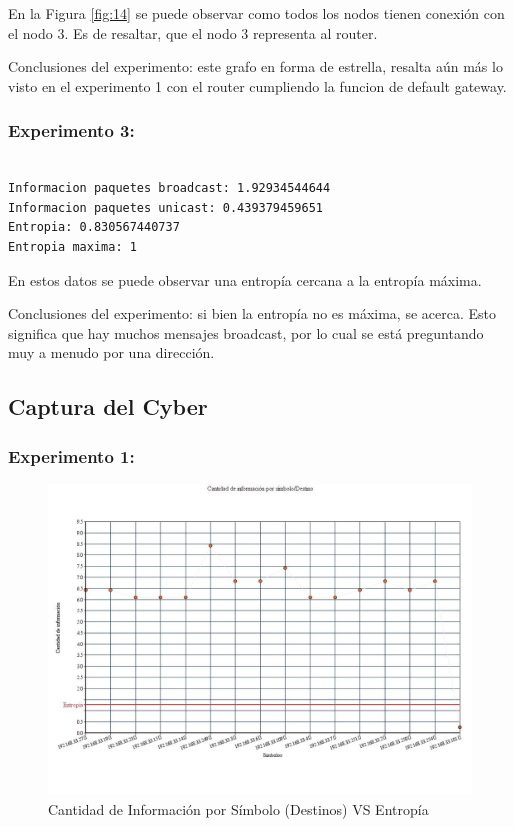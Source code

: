 En la Figura \ref{fig:14} se puede observar como todos los nodos tienen conexión con el nodo 3. Es de resaltar, que el nodo 3 representa al router.

Conclusiones del experimento: este grafo en forma de estrella, resalta aún más lo visto en el experimento 1 con el router cumpliendo la funcion de default gateway.

\subsubsection{Experimento 3:}
\begin{verbatim}

Informacion paquetes broadcast: 1.92934544644
Informacion paquetes unicast: 0.439379459651
Entropia: 0.830567440737
Entropia maxima: 1

\end{verbatim}

En estos datos se puede observar una entropía cercana a la entropía máxima.

Conclusiones del experimento: si bien la entropía no es máxima, se acerca. Esto significa que hay muchos mensajes broadcast, por lo cual se está preguntando muy a menudo por una dirección.

\subsection{Captura del Cyber}

\subsubsection{Experimento 1:}

\begin{figure}[H]
  \centering
    \includegraphics[scale=0.45]{imagenes/graficos/entropiaCantInf/06destino.jpg}
  \caption{Cantidad de Información por Símbolo (Destinos) VS Entropía}
  \label{fig:15}
\end{figure}

